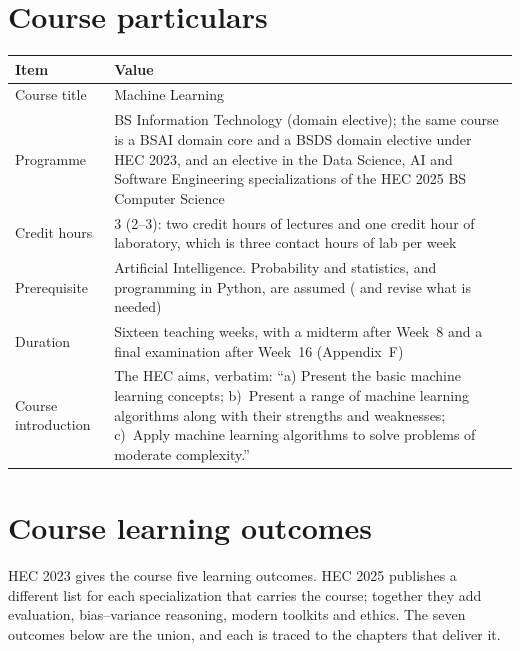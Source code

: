 \section*{Course particulars}

\begin{longtable}{@{}L{4.2cm}L{11.0cm}@{}}
\toprule
{}
\textbf{Item} & \textbf{Value} \\
\midrule
\endhead
Course title & Machine Learning \\
Programme & BS Information Technology (domain elective); the same course is a
BSAI domain core and a BSDS domain elective under HEC 2023, and an elective in
the Data Science, AI and Software Engineering specializations of the HEC 2025
BS Computer Science \\
Credit hours & 3 (2--3): two credit hours of lectures and one credit hour of
laboratory, which is three contact hours of lab per week \\
Prerequisite & Artificial Intelligence. Probability and statistics, and
programming in Python, are assumed ( and  revise what
is needed) \\
Duration & Sixteen teaching weeks, with a midterm after Week~8 and a final
examination after Week~16 (Appendix~F) \\
Course introduction & The HEC aims, verbatim: ``a) Present the basic machine
learning concepts; b)~Present a range of machine learning algorithms along with
their strengths and weaknesses; c)~Apply machine learning algorithms to solve
problems of moderate complexity.'' \\
\bottomrule
\end{longtable}

\section*{Course learning outcomes}

HEC 2023 gives the course five learning outcomes. HEC 2025 publishes a different
list for each specialization that carries the course; together they add
evaluation, bias--variance reasoning, modern toolkits and ethics. The seven
outcomes below are the union, and each is traced to the chapters that deliver it.

